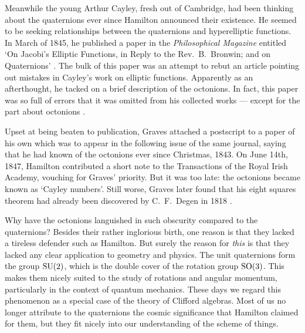 Meanwhile the young Arthur Cayley, fresh out of Cambridge, had been
thinking about the quaternions ever since Hamilton announced their
existence.  He seemed to be seeking relationships between the
quaternions and hyperelliptic functions.  In March of 1845, he published
a paper in the {\it Philosophical Magazine} entitled `On Jacobi's
Elliptic Functions, in Reply to the Rev.\ B.\ Bronwin; and on Quaternions'
\cite{Cayley}.  The bulk of this paper was an attempt to rebut an
article pointing out mistakes in Cayley's work on elliptic functions.
Apparently as an afterthought, he tacked on a brief description of the
octonions.  In fact, this paper was so full of errors that it was 
omitted from his collected works --- except for the part about octonions
\cite{Cayley2}.

Upset at being beaten to publication, Graves attached a postscript to a
paper of his own which was to appear in the following issue of the same
journal, saying that he had known of the octonions ever since Christmas,
1843.  On June 14th, 1847, Hamilton contributed a short note to the
Transactions of the Royal Irish Academy, vouching for Graves' priority. 
But it was too late: the octonions became known as `Cayley numbers'. 
Still worse, Graves later found that his eight squares theorem had
already been discovered by C.\ F.\ Degen in 1818 \cite{Curtis,Dickson}.

Why have the octonions languished in such obscurity compared to the
quaternions?  Besides their rather inglorious birth, one reason is that
they lacked a tireless defender such as Hamilton.  But surely the reason
for {\it this} is that they lacked any clear application to geometry and
physics.  The unit quaternions form the group ${\rm SU}(2)$, which is the
double cover of the rotation group ${\rm SO}(3)$.  This makes them nicely
suited to the study of rotations and angular momentum, particularly in
the context of quantum mechanics.  These days we regard this phenomenon
as a special case of the theory of Clifford algebras.  Most of us no
longer attribute to the quaternions the cosmic significance that
Hamilton claimed for them, but they fit nicely into our understanding of
the scheme of things.
 
